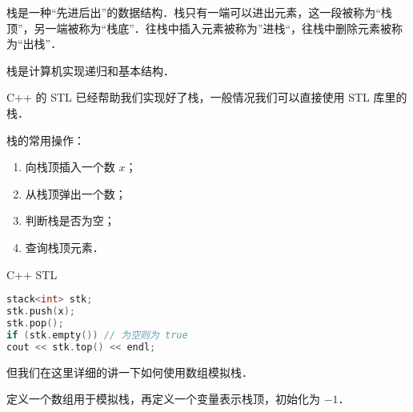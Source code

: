
栈是一种“先进后出”的数据结构．栈只有一端可以进出元素，这一段被称为“栈顶”，另一端被称为“栈底”．往栈中插入元素被称为”进栈“，往栈中删除元素被称为“出栈”．

栈是计算机实现递归和基本结构．

C++ 的 STL 已经帮助我们实现好了栈，一般情况我们可以直接使用 STL 库里的栈．

栈的常用操作：
\begin{enumerate}
\item 向栈顶插入一个数 $x$；
\item 从栈顶弹出一个数；
\item 判断栈是否为空；
\item 查询栈顶元素．
\end{enumerate}

C++ STL
\begin{lstlisting}[language=cpp]
stack<int> stk;
stk.push(x);
stk.pop();
if (stk.empty()) // 为空则为 true
cout << stk.top() << endl;
\end{lstlisting}

但我们在这里详细的讲一下如何使用数组模拟栈．

定义一个数组用于模拟栈，再定义一个变量表示栈顶，初始化为 $-1$．

